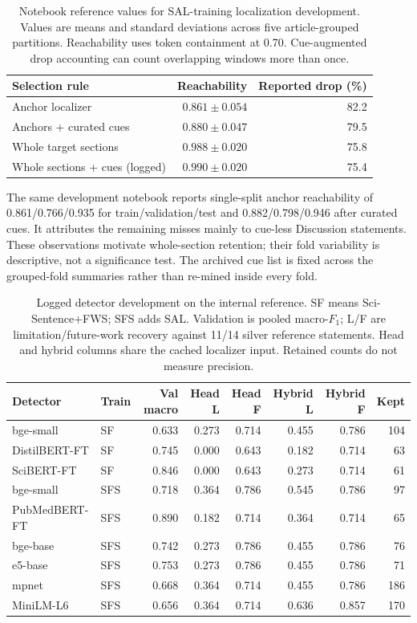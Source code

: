 \begin{table}[H]
\centering\small
\caption{Notebook reference values for SAL-training localization development. Values are means
and standard deviations across five article-grouped partitions. Reachability uses token
containment at 0.70. Cue-augmented drop accounting can count overlapping windows more than once.}
\label{T:localizer-cv}
\begin{tabular}{@{}lrr@{}}
\toprule
Selection rule & Reachability & Reported drop (\%) \\
\midrule
Anchor localizer & $0.861\pm0.054$ & 82.2 \\
Anchors + curated cues & $0.880\pm0.047$ & 79.5 \\
Whole target sections & $0.988\pm0.020$ & 75.8 \\
Whole sections + cues (logged) & $0.990\pm0.020$ & 75.4 \\
\bottomrule
\end{tabular}
\end{table}

The same development notebook reports single-split anchor reachability of 0.861/0.766/0.935
for train/validation/test and 0.882/0.798/0.946 after curated cues. It attributes the remaining
misses mainly to cue-less Discussion statements. These observations motivate whole-section
retention; their fold variability is descriptive, not a significance test. The archived cue
list is fixed across the grouped-fold summaries rather than re-mined inside every fold.

\begin{table}[H]
\centering\footnotesize
\caption{Logged detector development on the internal reference. SF means Sci-Sentence+FWS;
SFS adds SAL. Validation is pooled macro-$F_1$; L/F are limitation/future-work recovery against
11/14 silver reference statements. Head and hybrid columns share the cached localizer input.
Retained counts do not measure precision.}
\label{T:internal-full}
\begin{tabular}{@{}llrrrrrr@{}}
\toprule
Detector & Train & Val macro & Head L & Head F & Hybrid L & Hybrid F & Kept \\
\midrule
bge-small & SF & 0.633 & 0.273 & 0.714 & 0.455 & 0.786 & 104 \\
DistilBERT-FT & SF & 0.745 & 0.000 & 0.643 & 0.182 & 0.714 & 63 \\
SciBERT-FT & SF & 0.846 & 0.000 & 0.643 & 0.273 & 0.714 & 61 \\
bge-small & SFS & 0.718 & 0.364 & 0.786 & 0.545 & 0.786 & 97 \\
PubMedBERT-FT & SFS & 0.890 & 0.182 & 0.714 & 0.364 & 0.714 & 65 \\
bge-base & SFS & 0.742 & 0.273 & 0.786 & 0.455 & 0.786 & 76 \\
e5-base & SFS & 0.753 & 0.273 & 0.786 & 0.455 & 0.786 & 71 \\
mpnet & SFS & 0.668 & 0.364 & 0.714 & 0.455 & 0.786 & 186 \\
MiniLM-L6 & SFS & 0.656 & 0.364 & 0.714 & 0.636 & 0.857 & 170 \\
\bottomrule
\end{tabular}
\end{table}

